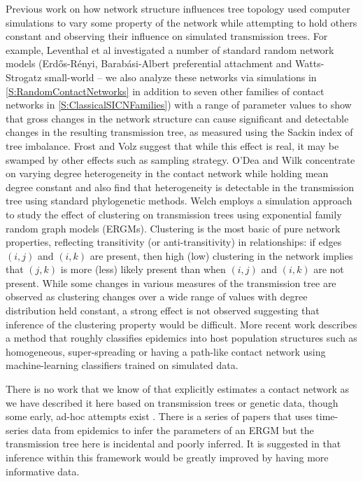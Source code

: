 \documentclass[review]{elsarticle}
\numberwithin{equation}{section}
\let\orgautoref\autoref
\renewcommand{\autoref}
        {\def\equationautorefname{Eq.}%
         \def\figureautorefname{Fig.}%
         \def\subfigureautorefname{Fig.}%
         \def\sectionautorefname{Sect.}%
         \def\subsectionautorefname{Sect.}%
         \def\subsubsectionautorefname{Sect.}%
         \def\Itemautorefname{item}%
         \def\tableautorefname{Table}%
         \def\propositionautorefname{Prop.}%
         \def\corollaryautorefname{Corollary}%
         \def\theoremautorefname{Theorem}%
         \def\remarkautorefname{Remark}%
         \def\lemmaautorefname{Lemma}%
         \def\proofofautorefname{Proof}%
         \def\exampleautorefname{Example}%
         \orgautoref}
\begin{document}
Previous work on how network structure influences tree topology used computer simulations to vary some property of the network while attempting to hold others constant and observing their influence on simulated transmission trees.   
For example, Leventhal et al \cite{leventhal2012} investigated a number of standard random network models (Erd\H{o}s-R\'enyi, Barab{\'a}si-Albert preferential attachment and Watts-Strogatz small-world -- we also analyze these networks via simulations in \autoref{S:RandomContactNetworks} in addition to seven other families of contact networks in \autoref{S:ClassicalSICNFamilies}) with a range of parameter values to show that gross changes in the network structure can cause significant and detectable changes in the resulting transmission tree, as measured using the Sackin index of tree imbalance.  
Frost and Volz \cite{frost2012} suggest that while this effect is real, it may be swamped by other effects such as sampling strategy.  
O'Dea and Wilk \cite{odea2010} concentrate on varying degree heterogeneity in the contact network while holding mean degree  constant and also find that heterogeneity is detectable in the transmission tree using standard phylogenetic methods.  
Welch \cite{welch2011}  employs a simulation approach to study the effect of clustering on transmission trees using exponential family random graph models (ERGMs).  
Clustering is the most basic of pure network properties, reflecting transitivity (or anti-transitivity) in relationships: if edges $(i,j)$ and $(i,k)$ are present, then high (low) clustering in the network implies that $(j, k)$ is more (less) likely present than when $(i,j)$ and $(i,k)$ are not present.  
While some changes in various measures of the transmission tree are observed as clustering changes over a wide range of values with  degree distribution  held constant, a strong effect is not observed suggesting that inference of the clustering property would be difficult.  
More recent work \citep{Colijn2014} describes a method that roughly classifies epidemics into host population structures such as homogeneous, super-spreading \citep{lloyd2005} or having a path-like contact network using machine-learning classifiers trained on simulated data. 

There is no work that we know of that explicitly estimates a contact network as we have described it here based on transmission trees or genetic data, though some early, ad-hoc attempts exist \citep{ leighbrown2011}.  
There is a series of papers \citep{britton2002, groendyke2011, groendyke2012} that uses time-series data from epidemics to infer the parameters of an ERGM but the transmission tree here is incidental and poorly inferred.  
It is suggested in \cite{groendyke2012} that inference within this framework would be greatly improved by having more informative data.
\end{document}
